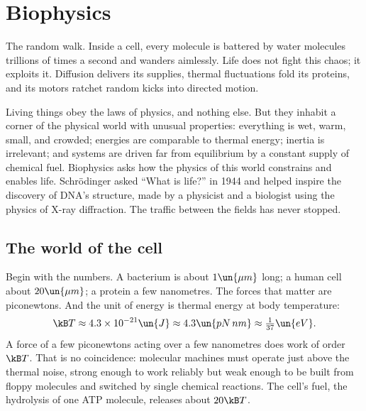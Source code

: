 \chapter{Biophysics}
\label{ch:bio}



\begin{prototype}
The random walk. Inside a cell, every molecule is battered by water molecules trillions of times a second and wanders aimlessly. Life does not fight this chaos; it exploits it. Diffusion delivers its supplies, thermal fluctuations fold its proteins, and its motors ratchet random kicks into directed motion.
\end{prototype}

Living things obey the laws of physics, and nothing else. But they inhabit a corner of the physical world with unusual properties: everything is wet, warm, small, and crowded; energies are comparable to thermal energy; inertia is irrelevant; and systems are driven far from equilibrium by a constant supply of chemical fuel. Biophysics asks how the physics of this world constrains and enables life. Schr\"odinger asked ``What is life?'' in 1944 and helped inspire the discovery of DNA's structure, made by a physicist and a biologist using the physics of X-ray diffraction. The traffic between the fields has never stopped.

\section{The world of the cell}

Begin with the numbers. A bacterium is about $1\un{\mu m}$ long; a human cell about $20\un{\mu m}$; a protein a few nanometres. The forces that matter are piconewtons. And the unit of energy is thermal energy at body temperature:
\[
  \kB T\approx4.3\times10^{-21}\un{J}\approx4.3\un{pN\,nm}\approx\tfrac{1}{37}\un{eV}.
\]
A force of a few piconewtons acting over a few nanometres does work of order $\kB T$. That is no coincidence: molecular machines must operate just above the thermal noise, strong enough to work reliably but weak enough to be built from floppy molecules and switched by single chemical reactions. The cell's fuel, the hydrolysis of one ATP molecule, releases about $20\kB T$.

